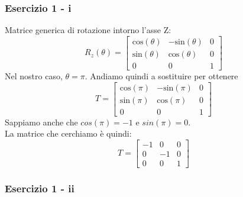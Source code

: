 \documentclass{beamer}
\newcommand{\fig}{figures} %
\begin{document}
\begin{frame}
\frametitle{Esercizio 1 - i}
Matrice generica di rotazione intorno l'asse Z:
\begin{equation*}
R_z(\theta) = 
\begin{bmatrix}
\mbox{cos}(\theta) & - \mbox{sin}(\theta) & 0\\
\mbox{sin}(\theta) & \mbox{cos}(\theta)   & 0\\ 
0 & 0 & 1 
\end{bmatrix}
\end{equation*}
    Nel nostro caso, $\theta = \pi$. Andiamo quindi a sostituire per ottenere
\begin{equation*}
T = 
\begin{bmatrix}
\mbox{cos}(\pi) & - \mbox{sin}(\pi) & 0\\
\mbox{sin}(\pi) & \mbox{cos}(\pi)   & 0\\ 
0 & 0 & 1 
\end{bmatrix}
\end{equation*}
    Sappiamo anche che $cos(\pi) = -1$ e $sin(\pi) = 0$.\\ 
    La matrice che cerchiamo \`e quindi:
\begin{equation*}
T = 
\begin{bmatrix}
-1 & 0 & 0\\
0 & -1  & 0\\ 
0 & 0 & 1 
\end{bmatrix}
\end{equation*}
\end{frame}


\begin{frame}
\frametitle{Esercizio 1 - ii}
\begin{center}
\end{center}
\end{frame}
\end{document}
